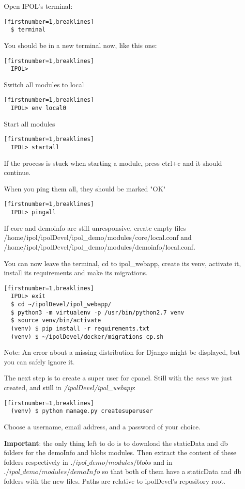 \documentclass[a4paper,12pt]{article}
\begin{document}
Open IPOL's terminal:
\begin{verbatim}[firstnumber=1,breaklines]
  $ terminal
\end{verbatim}

You should be in a new terminal now, like this one:
\begin{verbatim}[firstnumber=1,breaklines]
  IPOL>
\end{verbatim}

Switch all modules to local
\begin{verbatim}[firstnumber=1,breaklines]
  IPOL> env local0
\end{verbatim}

Start all modules
\begin{verbatim}[firstnumber=1,breaklines]
  IPOL> startall
\end{verbatim}
If the process is stuck when starting a module, press ctrl+c and it should continue.

When you ping them all, they should be marked "OK"
\begin{verbatim}[firstnumber=1,breaklines]
  IPOL> pingall
\end{verbatim}
If core and demoinfo are still unresponsive, create empty files /home/ipol/ipolDevel/ipol\_demo/modules/core/local.conf and /home/ipol/ipolDevel/ipol\_demo/modules/demoinfo/local.conf.

You can now leave the terminal, cd to ipol\_webapp, create its venv, activate it, install its 
requirements and make its migrations.
\begin{verbatim}[firstnumber=1,breaklines]
  IPOL> exit
  $ cd ~/ipolDevel/ipol_webapp/
  $ python3 -m virtualenv -p /usr/bin/python2.7 venv
  $ source venv/bin/activate
  (venv) $ pip install -r requirements.txt
  (venv) $ ~/ipolDevel/docker/migrations_cp.sh
\end{verbatim}

Note: An error about a missing distribution for Django might be displayed, but you can safely ignore it.

The next step is to create a super user for cpanel. Still with the \emph{venv} we just created, and
still in \emph{\~/ipolDevel/ipol\_webapp}:
\begin{verbatim}[firstnumber=1,breaklines]
  (venv) $ python manage.py createsuperuser
\end{verbatim}

Choose a username, email address, and a password of your choice.

\textbf{Important}: the only thing left to do is to download the staticData and db folders for the demoInfo
and blobs modules. 
Then extract the content of these folders respectively in \emph{$./ipol\_demo/modules/blobs$}
and in \emph{$./ipol\_demo/modules/demoInfo$} so that both of them have a staticData and db folders
with the new files. Paths are relative to ipolDevel's repository root.
\end{document}
